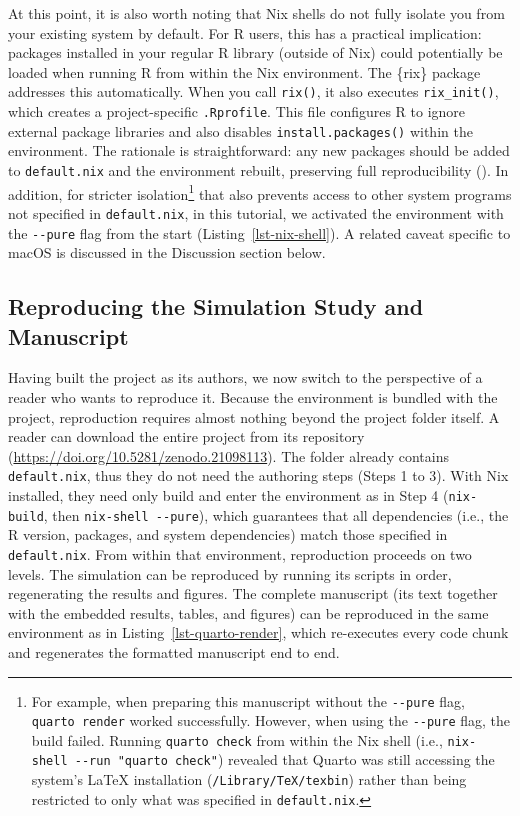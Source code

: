 \documentclass[
  man,
  longtable,
  nolmodern,
  notxfonts,
  notimes,
  colorlinks=true,linkcolor=blue,citecolor=blue,urlcolor=blue]{apa7}
\begin{document}
At this point, it is also worth noting that Nix shells do not fully
isolate you from your existing system by default. For R users, this has
a practical implication: packages installed in your regular R library
(outside of Nix) could potentially be loaded when running R from within
the Nix environment. The \{rix\} package addresses this automatically.
When you call \texttt{rix()}, it also executes \texttt{rix\_init()},
which creates a project-specific \texttt{.Rprofile}. This file
configures R to ignore external package libraries and also disables
\texttt{install.packages()} within the environment. The rationale is
straightforward: any new packages should be added to
\texttt{default.nix} and the environment rebuilt, preserving full
reproducibility (). In addition, for stricter isolation\footnote{For
  example, when preparing this manuscript without the \texttt{-\/-pure}
  flag, \texttt{quarto\ render} worked successfully. However, when using
  the \texttt{-\/-pure} flag, the build failed. Running
  \texttt{quarto\ check} from within the Nix shell (i.e.,
  \texttt{nix-shell\ -\/-run\ "quarto\ check"}) revealed that Quarto was
  still accessing the system's LaTeX installation
  (\texttt{/Library/TeX/texbin}) rather than being restricted to only
  what was specified in \texttt{default.nix}.} that also prevents access
to other system programs not specified in \texttt{default.nix}, in this
tutorial, we activated the environment with the \texttt{-\/-pure} flag
from the start (Listing~\ref{lst-nix-shell}). A related caveat specific
to macOS is discussed in the Discussion section below.

\subsection{Reproducing the Simulation Study and
Manuscript}\label{reproducing-the-simulation-study-and-manuscript}

Having built the project as its authors, we now switch to the
perspective of a reader who wants to reproduce it. Because the
environment is bundled with the project, reproduction requires almost
nothing beyond the project folder itself. A reader can download the
entire project from its repository
(\url{https://doi.org/10.5281/zenodo.21098113}). The folder already
contains \texttt{default.nix}, thus they do not need the authoring steps
(Steps 1 to 3). With Nix installed, they need only build and enter the
environment as in Step 4 (\texttt{nix-build}, then
\texttt{nix-shell\ -\/-pure}), which guarantees that all dependencies
(i.e., the R version, packages, and system dependencies) match those
specified in \texttt{default.nix}. From within that environment,
reproduction proceeds on two levels. The simulation can be reproduced by
running its scripts in order, regenerating the results and figures. The
complete manuscript (its text together with the embedded results,
tables, and figures) can be reproduced in the same environment as in
Listing~\ref{lst-quarto-render}, which re-executes every code chunk and
regenerates the formatted manuscript end to end.
\end{document}
